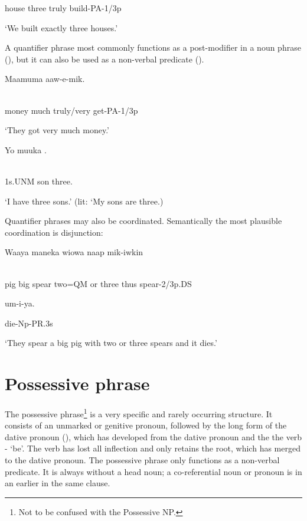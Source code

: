 house  three  truly  build-PA-1/3p

`We built exactly three houses.'

A quantifier phrase most commonly functions as a post-modifier in a noun phrase (), but it can also be used as a non-verbal predicate ().

\ea%
\label{ex:x846}
\gll Maamuma    aaw-e-mik. \\
      \\
\glt
\z

money  much  truly/very  get-PA-1/3p

`They got very much money.'

\ea%
\label{ex:x843}
\gll Yo  muuka  . \\
      \\
\glt
\z

1s.UNM  son  three.

`I have three sons.'  (lit: `My sons are three.)

Quantifier phrases may also be coordinated. Semantically the most plausible coordination is disjunction: 

\ea%
\label{ex:x1360}
\gll Waaya  maneka  wiowa    naap  mik-iwkin \\
      \\
\glt
\z

pig  big  spear  two=QM  or  three  thus  spear-2/3p.DS  

um-i-ya.

die-Np-PR.3s

`They spear a big pig with two or three spears and it dies.'

\section{Possessive phrase}
{}
The possessive phrase\footnote{Not to be confused with the Possessive NP.} is a very specific and rarely occurring structure. It consists of an unmarked or genitive pronoun, followed by the long form of the dative pronoun (), which has developed from the dative pronoun and the the verb - `be'. The verb has lost all inflection and only retains the root, which has merged to the dative pronoun. The possessive phrase only functions as a non-verbal predicate. It is always without a head noun; a co-referential noun or pronoun is in an earlier  in the same clause.

